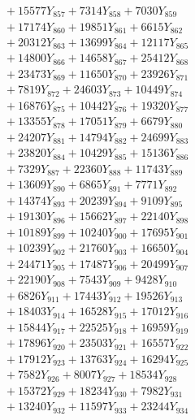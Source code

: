 \documentclass[a4paper,10pt]{article}
\begin{document}
{\begin{align}
&\;  + 15577 Y_{857} + 7314 Y_{858} + 7030 Y_{859} \\[0.3ex]
&\;  + 17174 Y_{860} + 19851 Y_{861} + 6615 Y_{862} \\[0.3ex]
&\;  + 20312 Y_{863} + 13699 Y_{864} + 12117 Y_{865} \\[0.3ex]
&\;  + 14800 Y_{866} + 14658 Y_{867} + 25412 Y_{868} \\[0.5ex]\allowbreak
&\;  + 23473 Y_{869} + 11650 Y_{870} + 23926 Y_{871} \\[0.3ex]
&\;  + 7819 Y_{872} + 24603 Y_{873} + 10449 Y_{874} \\[0.3ex]
&\;  + 16876 Y_{875} + 10442 Y_{876} + 19320 Y_{877} \\[0.3ex]
&\;  + 13355 Y_{878} + 17051 Y_{879} + 6679 Y_{880} \\[0.3ex]
&\;  + 24207 Y_{881} + 14794 Y_{882} + 24699 Y_{883} \\[0.3ex]
&\;  + 23820 Y_{884} + 10429 Y_{885} + 15136 Y_{886} \\[0.3ex]
&\;  + 7329 Y_{887} + 22360 Y_{888} + 11743 Y_{889} \\[0.3ex]
&\;  + 13609 Y_{890} + 6865 Y_{891} + 7771 Y_{892} \\[0.3ex]
&\;  + 14374 Y_{893} + 20239 Y_{894} + 9109 Y_{895} \\[0.3ex]
&\;  + 19130 Y_{896} + 15662 Y_{897} + 22140 Y_{898} \\[0.5ex]\allowbreak
&\;  + 10189 Y_{899} + 10240 Y_{900} + 17695 Y_{901} \\[0.3ex]
&\;  + 10239 Y_{902} + 21760 Y_{903} + 16650 Y_{904} \\[0.3ex]
&\;  + 24471 Y_{905} + 17487 Y_{906} + 20499 Y_{907} \\[0.3ex]
&\;  + 22190 Y_{908} + 7543 Y_{909} + 9428 Y_{910} \\[0.3ex]
&\;  + 6826 Y_{911} + 17443 Y_{912} + 19526 Y_{913} \\[0.3ex]
&\;  + 18403 Y_{914} + 16528 Y_{915} + 17012 Y_{916} \\[0.3ex]
&\;  + 15844 Y_{917} + 22525 Y_{918} + 16959 Y_{919} \\[0.3ex]
&\;  + 17896 Y_{920} + 23503 Y_{921} + 16557 Y_{922} \\[0.3ex]
&\;  + 17912 Y_{923} + 13763 Y_{924} + 16294 Y_{925} \\[0.3ex]
&\;  + 7582 Y_{926} + 8007 Y_{927} + 18534 Y_{928} \\[0.5ex]\allowbreak
&\;  + 15372 Y_{929} + 18234 Y_{930} + 7982 Y_{931} \\[0.3ex]
&\;  + 13240 Y_{932} + 11597 Y_{933} + 23244 Y_{934} \\[0.3ex]

\end{align}}
\end{document}
